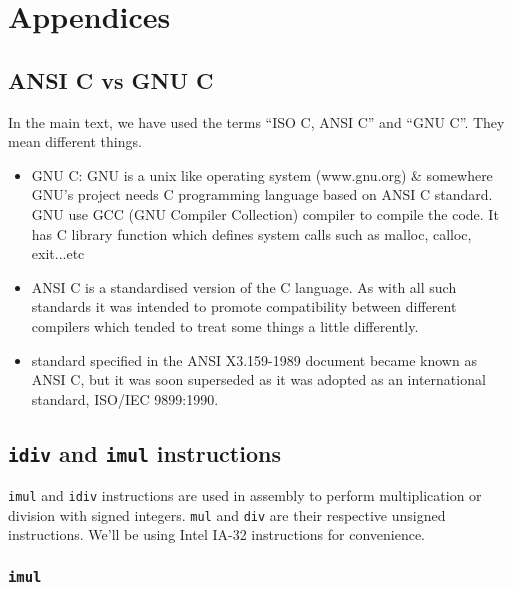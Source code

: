 \documentclass[a4paper]{article}
\begin{document}
\section{Appendices}




\newpage
\subsection{ANSI C vs GNU C}
\label{app:gnu_vs_iso}
In the main text, we have used the terms ``ISO C, ANSI C'' and ``GNU C''. They mean different things.

\begin{itemize}
    \item GNU C: GNU is a unix like operating system (www.gnu.org) \& somewhere GNU's project needs C programming language based on ANSI C standard. GNU use GCC (GNU Compiler Collection) compiler to compile the code. It has C library function which defines system calls such as malloc, calloc, exit...etc
    \item ANSI C is a standardised version of the C language. As with all such standards it was intended to promote compatibility between different compilers which tended to treat some things a little differently.
    \item standard specified in the ANSI X3.159-1989 document became known as ANSI C, but it was soon superseded as it was adopted as an international standard, ISO/IEC 9899:1990.
\end{itemize}




\newpage
\subsection{\texttt{idiv} and \texttt{imul} instructions}
\label{app:idiv_imul}
\texttt{imul} and \texttt{idiv} instructions are used in assembly to perform multiplication or division with signed integers. \texttt{mul} and \texttt{div} are their respective unsigned instructions. We'll be using Intel IA-32 instructions for convenience. 


\subsubsection{\texttt{imul}}
 
\end{document}
